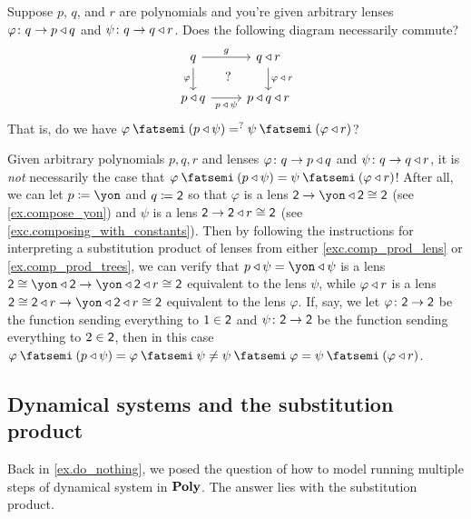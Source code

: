 \documentclass[Book-Poly]{subfiles}
\begin{document}
\begin{exercise}
Suppose $p$, $q$, and $r$ are polynomials and you're given arbitrary lenses $\varphi\colon q\to p\mathbin{\triangleleft} q$ and $\psi\colon q\to q\mathbin{\triangleleft} r$. Does the following diagram necessarily commute?
\[
\begin{tikzcd}
	q\ar[r, "g"]\ar[d, "\varphi"']&
	q\tri r\ar[d, "\varphi\:\tri\:r"]\\
	p\tri q\ar[r, "p\:\tri\:\psi"']&
	p\tri q\tri r\ar[ul, phantom, "?"]
\end{tikzcd}
\]
That is, do we have $\varphi\then (p\tri \psi)=^?\psi\then (\varphi\tri r)$?
\begin{solution}
Given arbitrary polynomials $p,q,r$ and lenses $\varphi\colon q\to p\mathbin{\triangleleft} q$ and $\psi\colon q\to q\mathbin{\triangleleft} r$, it is \emph{not} necessarily the case that $\varphi\then (p\tri \psi)=\psi\then (\varphi\tri r)$!
After all, we can let $p\coloneqq\yon$ and $q\coloneqq\textsf{2}$ so that $\varphi$ is a lens $\2\to\yon\tri\2\iso\2$ (see \cref{ex.compose_yon}) and $\psi$ is a lens $\textsf{2}\to\textsf{2}\mathbin{\triangleleft} r\cong\textsf{2}$ (see \cref{exc.composing_with_constants}).
Then by following the instructions for interpreting a substitution product of lenses from either \cref{exc.comp_prod_lens} or \cref{ex.comp_prod_trees}, we can verify that $p\tri \psi=\yon\tri \psi$ is a lens $\2\iso\yon\tri\2\to\yon\tri\2\tri r\iso\2$ equivalent to the lens $\psi$, while $\varphi\mathbin{\triangleleft} r$ is a lens $\2\iso\2\tri r\to\yon\tri\2\tri r\iso\2$ equivalent to the lens $\varphi$.
If, say, we let $\varphi\colon\textsf{2}\to\textsf{2}$ be the function sending everything to $1\in\textsf{2}$ and $\psi\colon\textsf{2}\to\textsf{2}$ be the function sending everything to $2\in\textsf{2}$, then in this case $\varphi\then (p\tri \psi)=\varphi\then \psi\neq \psi\then \varphi=\psi\then (\varphi\tri r)$.
\end{solution}
\end{exercise}

\subsection{Dynamical systems and the substitution product} \label{subsec.comon.comp.def.dyn_sys}

Back in \cref{ex.do_nothing}, we posed the question of how to model running multiple steps of dynamical system in $\mathbf{Poly}$.
The answer lies with the substitution product.
\end{document}
